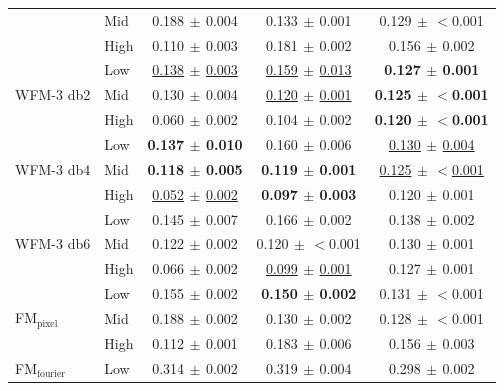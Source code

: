 \begin{table}[ht]
{\begin{tabular}{llccc}
 & Mid & 0.188{\scriptsize$\,\pm\,$0.004} & 0.133{\scriptsize$\,\pm\,$0.001} & 0.129{\scriptsize$\,\pm\,$$<$0.001} \\
 & High & 0.110{\scriptsize$\,\pm\,$0.003} & 0.181{\scriptsize$\,\pm\,$0.002} & 0.156{\scriptsize$\,\pm\,$0.002} \\
\midrule
\multirow{3}{*}{WFM-3 db2} & Low & \underline{0.138{\scriptsize$\,\pm\,$0.003}} & \underline{0.159{\scriptsize$\,\pm\,$0.013}} & \textbf{0.127{\scriptsize$\,\pm\,$0.001}} \\
 & Mid & 0.130{\scriptsize$\,\pm\,$0.004} & \underline{0.120{\scriptsize$\,\pm\,$0.001}} & \textbf{0.125{\scriptsize$\,\pm\,$$<$0.001}} \\
 & High & 0.060{\scriptsize$\,\pm\,$0.002} & 0.104{\scriptsize$\,\pm\,$0.002} & \textbf{0.120{\scriptsize$\,\pm\,$$<$0.001}} \\
\midrule
\multirow{3}{*}{WFM-3 db4} & Low & \textbf{0.137{\scriptsize$\,\pm\,$0.010}} & 0.160{\scriptsize$\,\pm\,$0.006} & \underline{0.130{\scriptsize$\,\pm\,$0.004}} \\
 & Mid & \textbf{0.118{\scriptsize$\,\pm\,$0.005}} & \textbf{0.119{\scriptsize$\,\pm\,$0.001}} & \underline{0.125{\scriptsize$\,\pm\,$$<$0.001}} \\
 & High & \underline{0.052{\scriptsize$\,\pm\,$0.002}} & \textbf{0.097{\scriptsize$\,\pm\,$0.003}} & 0.120{\scriptsize$\,\pm\,$0.001} \\
\midrule
\multirow{3}{*}{WFM-3 db6} & Low & 0.145{\scriptsize$\,\pm\,$0.007} & 0.166{\scriptsize$\,\pm\,$0.002} & 0.138{\scriptsize$\,\pm\,$0.002} \\
 & Mid & 0.122{\scriptsize$\,\pm\,$0.002} & 0.120{\scriptsize$\,\pm\,$$<$0.001} & 0.130{\scriptsize$\,\pm\,$0.001} \\
 & High & 0.066{\scriptsize$\,\pm\,$0.002} & \underline{0.099{\scriptsize$\,\pm\,$0.001}} & 0.127{\scriptsize$\,\pm\,$0.001} \\
\midrule
\multirow{3}{*}{FM$_\text{pixel}$} & Low & 0.155{\scriptsize$\,\pm\,$0.002} & \textbf{0.150{\scriptsize$\,\pm\,$0.002}} & 0.131{\scriptsize$\,\pm\,$$<$0.001} \\
 & Mid & 0.188{\scriptsize$\,\pm\,$0.002} & 0.130{\scriptsize$\,\pm\,$0.002} & 0.128{\scriptsize$\,\pm\,$$<$0.001} \\
 & High & 0.112{\scriptsize$\,\pm\,$0.001} & 0.183{\scriptsize$\,\pm\,$0.006} & 0.156{\scriptsize$\,\pm\,$0.003} \\
\midrule
\multirow{3}{*}{FM$_\text{fourier}$} & Low & 0.314{\scriptsize$\,\pm\,$0.002} & 0.319{\scriptsize$\,\pm\,$0.004} & 0.298{\scriptsize$\,\pm\,$0.002} \\

\end{tabular}}
\end{table}

